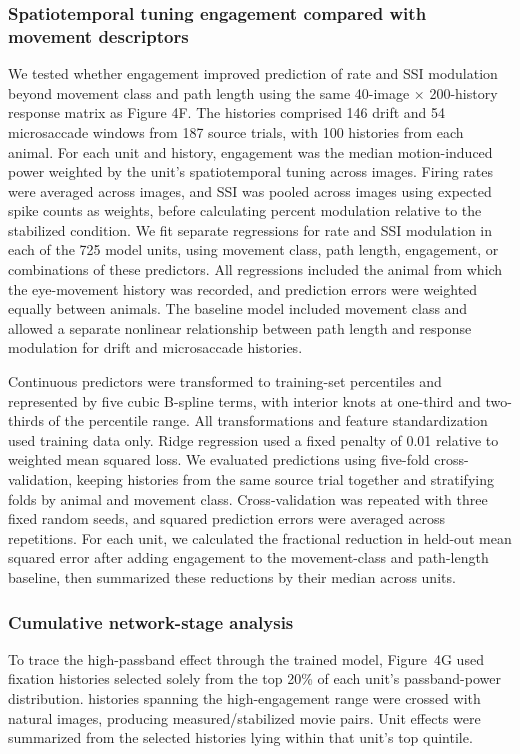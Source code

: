 \documentclass{lite}
\begin{document}
\subsubsection{Spatiotemporal tuning engagement compared with movement descriptors}

We tested whether engagement improved prediction of rate and SSI modulation beyond movement class and path length using the same 40-image × 200-history response matrix as Figure 4F. The histories comprised 146 drift and 54 microsaccade windows from 187 source trials, with 100 histories from each animal. For each unit and history, engagement was the median motion-induced power weighted by the unit's spatiotemporal tuning across images. Firing rates were averaged across images, and SSI was pooled across images using expected spike counts as weights, before calculating percent modulation relative to the stabilized condition. We fit separate regressions for rate and SSI modulation in each of the 725 model units, using movement class, path length, engagement, or combinations of these predictors. All regressions included the animal from which the eye-movement history was recorded, and prediction errors were weighted equally between animals. The baseline model included movement class and allowed a separate nonlinear relationship between path length and response modulation for drift and microsaccade histories.

Continuous predictors were transformed to training-set percentiles and represented by five cubic B-spline terms, with interior knots at one-third and two-thirds of the percentile range. All transformations and feature standardization used training data only. Ridge regression used a fixed penalty of 0.01 relative to weighted mean squared loss. We evaluated predictions using five-fold cross-validation, keeping histories from the same source trial together and stratifying folds by animal and movement class. Cross-validation was repeated with three fixed random seeds, and squared prediction errors were averaged across repetitions. For each unit, we calculated the fractional reduction in held-out mean squared error after adding engagement to the movement-class and path-length baseline, then summarized these reductions by their median across units. 

\subsubsection{Cumulative network-stage analysis}

To trace the high-passband effect through the trained model, Figure~4G used fixation histories selected solely from the top 20\% of each unit's passband-power distribution. \FigFourStageTraces{} histories spanning the high-engagement range were crossed with \FigFourStageImages{} natural images, producing \FigFourStageMovies{} measured/stabilized movie pairs. Unit effects were summarized from the selected histories lying within that unit's top quintile.
\end{document}
